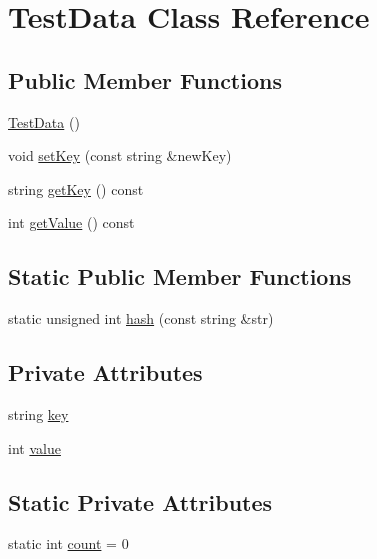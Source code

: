 \hypertarget{class_test_data}{\section{Test\+Data Class Reference}
\label{class_test_data}
}
\subsection*{Public Member Functions}
\begin{DoxyCompactItemize}
\item 
\hyperlink{class_test_data_aa4a3dd519ba3a3ae02956b627d42d123}{Test\+Data} ()
\item 
void \hyperlink{class_test_data_a72cb0d5febcf77e8a6dd494fa6dff411}{set\+Key} (const string \&new\+Key)
\item 
string \hyperlink{class_test_data_ae20d0a4c5fba891d728c68ac4ec79654}{get\+Key} () const 
\item 
int \hyperlink{class_test_data_af33e667b6962f8a351f7a660a1a24c5e}{get\+Value} () const 
\end{DoxyCompactItemize}
\subsection*{Static Public Member Functions}
\begin{DoxyCompactItemize}
\item 
static unsigned int \hyperlink{class_test_data_a55f0e2851aa330be9921303107982f98}{hash} (const string \&str)
\end{DoxyCompactItemize}
\subsection*{Private Attributes}
\begin{DoxyCompactItemize}
\item 
string \hyperlink{class_test_data_a16fe3a9a89c54e55fc56ae88590ae0c8}{key}
\item 
int \hyperlink{class_test_data_a8291f6b900b25a926deb1b2a393dc0ff}{value}
\end{DoxyCompactItemize}
\subsection*{Static Private Attributes}
\begin{DoxyCompactItemize}
\item 
static int \hyperlink{class_test_data_a9209c5345dda5dcb483b9c972fafc495}{count} = 0
\end{DoxyCompactItemize}


